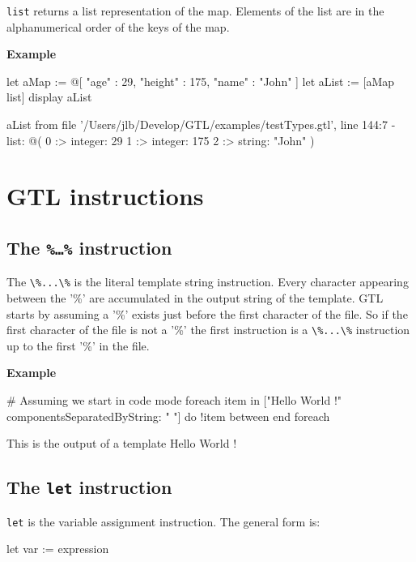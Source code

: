 \documentclass[10pt,openright,twosides]{report}
\newcommand{\ccst}[1]{{\footnotesize\ttfamily\colorbox{light-blue}{'#1'}}}
\newcommand{\gtlinline}[1]{\colorbox{light-blue}{\lstinline[language=gtl]{#1}}}
\newcommand{\example}{\vspace{.75em}\noindent\textbf{Example}\vspace{0em}}
\begin{document}
\gtlinline{list} returns a list representation of the map. Elements of the list are in the alphanumerical order of the keys of the map.

\example
\begin{gtl}
let aMap := @[ "age" : 29, "height" : 175, "name" : "John" ]
let aList := [aMap list]
display aList
\end{gtl}
\begin{console}
aList from file '/Users/jlb/Develop/GTL/examples/testTypes.gtl', line 144:7
  - list: @(
    0 :>
        integer: 29
    1 :>
        integer: 175
    2 :>
        string: "John"
)
\end{console}


\chapter{GTL instructions}

\section{The \texttt{\%\ldots\%} instruction}

The \gtlinline{\%...\%} is the literal template string instruction. Every character appearing between the \ccst{\%} are accumulated in the output string of the template. GTL starts by assuming a \ccst{\%} exists just before the first character of the file. So if the first character of the file is not a \ccst{\%} the first instruction is a \gtlinline{\%...\%} instruction up to the first \ccst{\%} in the file. 

\example
\begin{gtl}
# Assuming we start in code mode
%
foreach item in ["Hello World !" componentsSeparatedByString: " "]
do
  !item
between%
%
end foreach%
%
\end{gtl}
\begin{templateoutput}
This is the output of a template
Hello
World
!
\end{templateoutput}

\section{The \texttt{let} instruction}

\gtlinline{let} is the variable assignment instruction. The general form is:

\begin{gtl}
let var := expression
\end{gtl}
\end{document}
